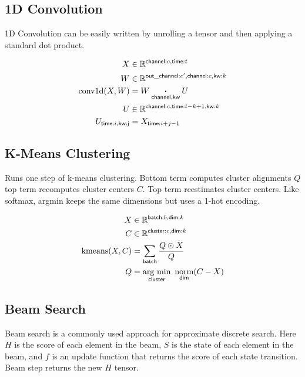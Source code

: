 \documentclass{article}
\newcommand{\name}[1]{\mathsf{#1}}
\newcommand{\ndot}[1]{\mathbin{\mathop{\thinspace\boldsymbol\cdot\thinspace}\displaylimits_{\name{#1}}}}
\newcommand{\nsum}[1]{\mathop{\sum}_{\name{#1}}}
\newcommand{\nfun}[2]{\mathop{\text{#2}}\displaylimits_{\name{#1}}}
\newcommand{\reals}{\mathbb{R}}
\begin{document}
\subsection{1D Convolution}

1D Convolution can be easily written by unrolling a tensor and then
applying a standard dot product.

\begin{align*} 
X &\in \reals^{{\name{channel}:c, \name{time}:t}}  \\
W &\in \reals^{{\name{out\_channel}:c', \name{channel}:c, \name{kw}:k}}  \\
\text{conv1d}(X, W) &= W \ndot{channel, kw} U \\
U &\in \reals^{{\name{channel}:c, \name{time}:t-k +1, \name{kw}:k}}  \\
U_{\name{time}:i, \name{kw:j}} & = X_{\name{time}:i+j - 1}  
\end{align*} 


\subsection{K-Means Clustering}

Runs one step of k-means clustering. Bottom term computes cluster
alignments $Q$ top term recomputes cluster centers $C$. Top term
reestimates cluster centers. Like softmax, argmin keeps the same
dimensions but uses a 1-hot encoding.

\begin{align*} 
X &\in \reals^{\name{batch}:b, \name{dim}:k}  \\
C &\in \reals^{\name{cluster}:c, \name{dim}:k}  \\
\text{kmeans}(X, C) &= \nsum{batch} \frac{ Q \odot X}{  Q} \\
Q &= \nfun{cluster}{arg~min} \ \nfun{dim}{norm}(C-X
)\end{align*}

\subsection{Beam Search}

Beam search is a commonly used approach for approximate discrete search. Here $H$ is the score of each element in the beam, $S$ is the state of each element in the beam, and $f$ is an update function that returns the score of each state transition. 
Beam step returns the new $H$ tensor. 
\end{document}
